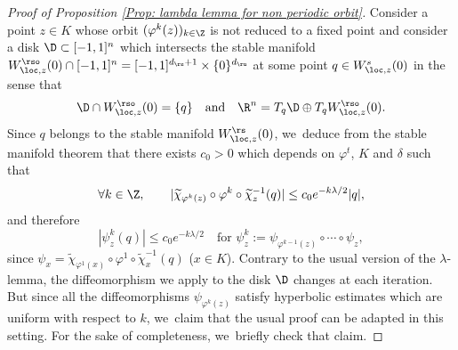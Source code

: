 \begin{appendix}
\begin{proof}[Proof of Proposition \ref{Prop: lambda lemma for non periodic orbit}]
Consider a point $z \in K$ whose orbit $(\varphi^k (z))_{k \in \Z}$ is not reduced to a fixed point and consider a disk $\D \subset [-1,1]^n$ which intersects the stable manifold $W_{\loc,z}^{\rso} (0) \cap [-1,1]^n =[-1,1]^{d_\rs +1} \times \{0\}^{d_\ru} $ at some point $q \in W_{\loc,z}^{s} (0)$ in the sense that
\[
\D \cap W_{\loc,z}^{\rso} (0) = \{q\} \quad \text{and} \quad \R^n = T_q \D \oplus T_q W_{\loc,z}^{\rso} (0).
\]
Since $q$ belongs to the stable manifold $ W_{\loc,z}^\rs (0)$, we~deduce from the stable manifold theorem that there exists $c_0 > 0$ which depends on $\varphi^t$, $K$ and $\delta$ such that
\[
\forall k \in \Z, \qquad | \widetilde{\chi}_{\varphi^k (z)} \circ \varphi^k \circ \widetilde{\chi}_{z}^{-1} (q)| \leq c_0 e^{- k\lambda /2} |q|,
\]
and therefore
\[
\left| \psi_z^k (q) \right| \leq c_0 e^{- k \lambda / 2} \quad \text{for } \psi_{z}^k:= \psi_{\varphi^{k-1}(z)} \circ \cdots \circ \psi_{z},
\]
since $\psi_x = \widetilde{\chi}_{\varphi^1 (x)} \circ \varphi^1 \circ \widetilde{\chi}_{x}^{-1} (q)$ ($x \in K$).
Contrary to the usual version of the $\lambda$-lemma, the diffeomorphism we apply to the disk $\D$ changes at each iteration. But since all the diffeomorphisms $\psi_{\varphi^k (z)}$ satisfy hyperbolic estimates which are uniform with respect to $k$, we~claim that the usual proof can be adapted in this setting. For the sake of completeness, we~briefly check that claim.


\end{proof}
\end{appendix}

